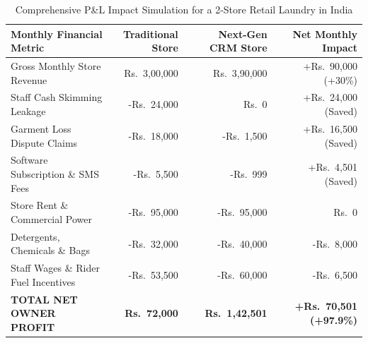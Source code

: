 \documentclass[11pt,a4paper]{article}
\begin{document}
\begin{table}[h!]
\centering
\begin{tabular}{p{6.5cm} r r r}
\toprule
\textbf{Monthly Financial Metric} & \textbf{Traditional Store} & \textbf{Next-Gen CRM Store} & \textbf{Net Monthly Impact} \\
\midrule
Gross Monthly Store Revenue & Rs.~3,00,000 & Rs.~3,90,000 & +Rs.~90,000 (+30\%) \\
Staff Cash Skimming Leakage & -Rs.~24,000 & Rs.~0 & +Rs.~24,000 (Saved) \\
Garment Loss Dispute Claims & -Rs.~18,000 & -Rs.~1,500 & +Rs.~16,500 (Saved) \\
Software Subscription \& SMS Fees & -Rs.~5,500 & -Rs.~999 & +Rs.~4,501 (Saved) \\
Store Rent \& Commercial Power & -Rs.~95,000 & -Rs.~95,000 & Rs.~0 \\
Detergents, Chemicals \& Bags & -Rs.~32,000 & -Rs.~40,000 & -Rs.~8,000 \\
Staff Wages \& Rider Fuel Incentives & -Rs.~53,500 & -Rs.~60,000 & -Rs.~6,500 \\
\midrule
\textbf{TOTAL NET OWNER PROFIT} & \textbf{Rs.~72,000} & \textbf{Rs.~1,42,501} & \textbf{+Rs.~70,501 (+97.9\%)} \\
\bottomrule
\end{tabular}
\caption{Comprehensive P\&L Impact Simulation for a 2-Store Retail Laundry in India}
\end{table}
\end{document}
